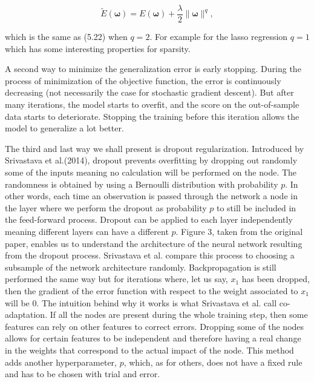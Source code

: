 \documentclass[a4paper,12pt]{article}
\numberwithin{equation}{section}
\begin{document}
\begin{equation}\label{eq:19}
\widetilde{E}(\boldsymbol{\omega}) = E(\boldsymbol{\omega}) + \frac{\lambda}{2}\|\boldsymbol{\omega}\|^q,
\end{equation}

which is the same as (5.22) when $q=2$. For example for the lasso regression $q=1$ which has some interesting properties for sparsity.

A second way to minimize the generalization error is early stopping. During the process of minimization of the objective function, the error is continuously decreasing (not necessarily the case for stochastic gradient descent). But after many iterations, the model starts to overfit, and the score on the out-of-sample data starts to deteriorate. Stopping the training before this iteration allows the model to generalize a lot better. 

The third and last way we shall present is dropout regularization. Introduced by Srivastava et al.(2014), dropout prevents overfitting by dropping out randomly some of the inputs meaning no calculation will be performed on the node. The randomness is obtained by using a Bernoulli distribution with probability $p$. In other words, each time an observation is passed through the network a node in the layer where we perform the dropout as probability $p$ to still be included in the feed-forward process. Dropout can be applied to each layer independently meaning different layers can have a different $p$. Figure 3, taken from the original paper, enables us to understand the architecture of the neural network resulting from the dropout process. Srivastava et al. compare this process to choosing a subsample of the network architecture randomly. Backpropagation is still performed the same way but for iterations where, let us say, $x_1$ has been dropped, then the gradient of the error function with respect to the weight associated to $x_1$ will be 0. The intuition behind why it works is what Srivastava et al. call co-adaptation. If all the nodes are present during the whole training step, then some features can rely on other features to correct errors. Dropping some of the nodes allows for certain features to be independent and therefore having a real change in the weights that correspond to the actual impact of the node. This method adds another hyperparameter, $p$, which, as for others, does not have a fixed rule and has to be chosen with trial and error.    
\end{document}
